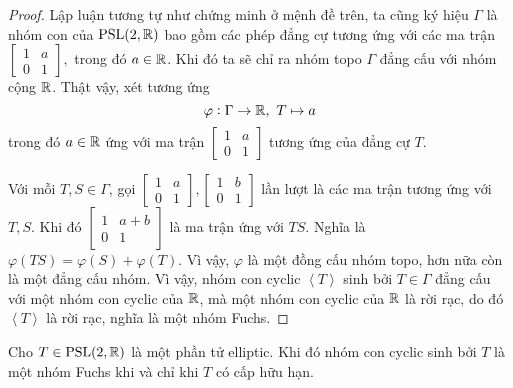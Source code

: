 \begin{proof}
    Lập luận tương tự như chứng minh ở mệnh đề trên, ta cũng ký hiệu $\Gamma$ là nhóm con của $\operatorname{PSL}(2,\mathbb{R})$ bao gồm các phép đẳng cự tương ứng với các ma trận $\begin{bmatrix}
        1 & a\\
        0 & 1
    \end{bmatrix},$ trong đó $a \in \mathbb{R}$. Khi đó ta sẽ chỉ ra nhóm topo $\Gamma$ đẳng cấu với nhóm cộng $\mathbb{R}$.
    Thật vậy, xét tương ứng
    \[\varphi: \Gamma \to \mathbb{R},~T \mapsto a\]
    trong đó $a \in \mathbb{R}$ ứng với ma trận $\begin{bmatrix}
        1 & a\\
        0 & 1
    \end{bmatrix}$ tương ứng của đẳng cự $T$. 
    
    Với mỗi $T,S \in \Gamma$, gọi $\begin{bmatrix}
        1 & a\\
        0 & 1
    \end{bmatrix}, \begin{bmatrix}
        1 & b\\
        0 & 1
    \end{bmatrix}$ lần lượt là các ma trận tương ứng với $T, S$. Khi đó $\begin{bmatrix}
        1 & a+b\\
        0 & 1
    \end{bmatrix}$ là ma trận ứng với $TS$. Nghĩa là $\varphi(TS) = \varphi(S)+\varphi(T)$. Vì vậy, $\varphi$ là một đồng cấu nhóm topo, hơn nữa còn là một đẳng cấu nhóm. Vì vậy, nhóm con cyclic $\left<T\right>$ sinh bởi $T \in \Gamma$ đẳng cấu với một nhóm con cyclic của $\mathbb{R}$, mà một nhóm con cyclic của $\mathbb{R}$ là rời rạc, do đó $\left<T\right>$ là rời rạc, nghĩa là một nhóm Fuchs.
\end{proof}
\begin{prop}\label{prop 3.2.11}
    Cho $T \in \operatorname{PSL}(2,\mathbb{R})$ là một phần tử elliptic. Khi đó nhóm con cyclic sinh bởi $T$ là một nhóm Fuchs khi và chỉ khi $T$ có cấp hữu hạn.
\end{prop}
